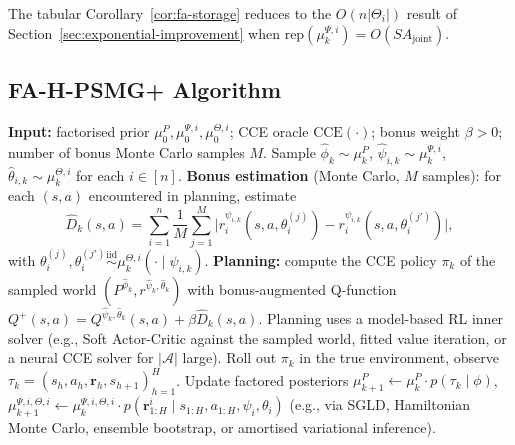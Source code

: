 \documentclass{article}
\def\textsuperscript#1{#1}%
\begin{document}
The tabular Corollary~\ref{cor:fa-storage} reduces to the $O(n |\Theta_i|)$ result of Section~\ref{sec:exponential-improvement} when $\mathrm{rep}(\mu_k^{\Psi, i}) = O(S A_{\mathrm{joint}})$.

\subsection{FA-H-PSMG\textsuperscript{+} Algorithm}
\label{app:fa-algorithm}

\begin{algorithm}[ht]
\caption{FA-H-PSMG\textsuperscript{+}: function-approximation H-PSMG\textsuperscript{+}}
\label{alg:fa-hpsmg-plus}
\begin{algorithmic}[1]
\STATE \textbf{Input:} factorised prior $\mu_0^P, \mu_0^{\Psi, i}, \mu_0^{\Theta, i}$; CCE oracle $\mathrm{CCE}(\cdot)$; bonus weight $\beta > 0$; number of bonus Monte Carlo samples $M$.
  \STATE Sample $\hat\phi_k \sim \mu_k^P$, $\hat\psi_{i,k} \sim \mu_k^{\Psi, i}$, $\hat\theta_{i,k} \sim \mu_k^{\Theta, i}$ for each $i \in [n]$.
  \STATE \textbf{Bonus estimation} (Monte Carlo, $M$ samples): for each $(s, a)$ encountered in planning, estimate
  \begin{equation*}
  \widehat{D}_k(s, a) = \sum_{i=1}^n \frac{1}{M} \sum_{j=1}^M \big|r_i^{\psi_{i,k}}(s, a, \theta_i^{(j)}) - r_i^{\psi_{i,k}}(s, a, \theta_i^{(j')})\big|,
  \end{equation*}
  with $\theta_i^{(j)}, \theta_i^{(j')} \stackrel{\mathrm{iid}}{\sim} \mu_k^{\Theta, i}(\cdot \mid \psi_{i,k})$.
  \STATE \textbf{Planning:} compute the CCE policy $\pi_k$ of the sampled world $(P^{\hat\phi_k}, r^{\hat\psi_k, \hat\theta_k})$ with bonus-augmented Q-function $Q^+(s, a) = Q^{\hat\psi_k, \hat\theta_k}(s, a) + \beta \widehat{D}_k(s, a)$. Planning uses a model-based RL inner solver (e.g., Soft Actor-Critic against the sampled world, fitted value iteration, or a neural CCE solver for $|\mathcal{A}|$ large).
  \STATE Roll out $\pi_k$ in the true environment, observe $\tau_k = (s_h, a_h, \boldsymbol{r}_h, s_{h+1})_{h=1}^H$.
  \STATE Update factored posteriors $\mu_{k+1}^P \leftarrow \mu_k^P \cdot p(\tau_k \mid \phi)$, $\mu_{k+1}^{\Psi, i, \Theta, i} \leftarrow \mu_k^{\Psi, i, \Theta, i} \cdot p(\boldsymbol{r}^i_{1:H} \mid s_{1:H}, a_{1:H}, \psi_i, \theta_i)$ (e.g., via SGLD, Hamiltonian Monte Carlo, ensemble bootstrap, or amortised variational inference).
\ENDFOR
\end{algorithmic}
\end{algorithm}
\end{document}
